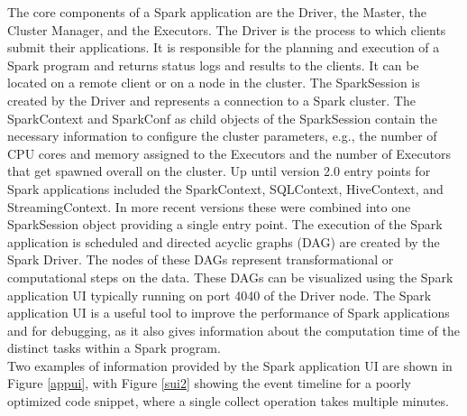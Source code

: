 \noindent The core components of a Spark application are the Driver, the Master, the Cluster Manager, and the Executors. The Driver is the process to which clients submit their applications. It is responsible for the planning and execution of a Spark program and returns status logs and results to the clients. It can be located on a remote client or on a node in the cluster. The SparkSession is created by the Driver and represents a connection to a Spark cluster. The SparkContext and SparkConf as child objects of the SparkSession contain the necessary information to configure the cluster parameters, e.g., the number of CPU cores and memory assigned to the Executors and the number of Executors that get spawned overall on the cluster. Up until version 2.0 entry points for Spark applications included the SparkContext, SQLContext, HiveContext, and StreamingContext. In more recent versions these were combined into one SparkSession object providing a single entry point.
The execution of the Spark application is scheduled and directed acyclic graphs (DAG) are created by the Spark Driver. The nodes of these DAGs represent transformational or computational steps on the data. These DAGs can be visualized using the Spark application UI typically running on port 4040 of the Driver node. The Spark application UI is a useful tool to improve the performance of Spark applications and for debugging, as it also gives information about the computation time of the distinct tasks within a Spark program. \cite[pp. 45 ff]{sparkbook1}\\
Two examples of information provided by the Spark application UI are shown in Figure \ref{appui}, with Figure \ref{sui2} showing the event timeline for a poorly optimized code snippet, where a single collect operation takes multiple minutes.\\


